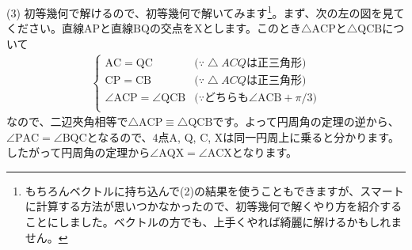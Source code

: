 \noindent (3) 初等幾何で解けるので、初等幾何で解いてみます\footnote{もちろんベクトルに持ち込んで(2)の結果を使うこともできますが、スマートに計算する方法が思いつかなかったので、初等幾何で解くやり方を紹介することにしました。ベクトルの方でも、上手くやれば綺麗に解けるかもしれません。}。まず、次の左の図を見てください。直線$\mathrm{AP}$と直線$\mathrm{BQ}$の交点を$\mathrm{X}$とします。このとき$\bigtriangleup\mathrm{ACP}$と$\bigtriangleup\mathrm{QCB}$について
\begin{align*}
\begin{cases}
\mathrm{AC} = \mathrm{QC} & \text{($\because\bigtriangleup{ACQ}$は正三角形)} \\
\mathrm{CP} = \mathrm{CB} & \text{($\because\bigtriangleup{ACQ}$は正三角形)} \\
\angle\mathrm{ACP} = \angle\mathrm{QCB} & \text{($\because$どちらも$\angle\mathrm{ACB} + \pi/3$)} \\
\end{cases}
\end{align*}
なので、二辺夾角相等で$\bigtriangleup\mathrm{ACP} \equiv \bigtriangleup\mathrm{QCB}$です。よって円周角の定理の逆から、$\angle\mathrm{PAC} = \angle\mathrm{BQC}$となるので、$4$点$\mathrm{A}$, $\mathrm{Q}$, $\mathrm{C}$, $\mathrm{X}$は同一円周上に乗ると分かります。したがって円周角の定理から$\angle\mathrm{AQX} = \angle\mathrm{ACX}$となります。


